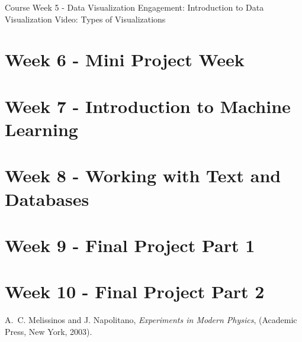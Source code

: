 \documentclass[letterpaper,12pt]{article}
\begin{document}
Course   Week 5 - Data Visualization   Engagement: Introduction to Data Visualization   Video: Types of Visualizations


\section{Week 6 - Mini Project Week
}

\section{Week 7 - Introduction to Machine Learning
}
\section{Week 8 - Working with Text and Databases
}


\section{Week 9 - Final Project Part 1
}

\section{Week 10 - Final Project Part 2
}

\begin{thebibliography}{99}

A.~C. Melissinos and J. Napolitano, \textit{Experiments in Modern Physics},
(Academic Press, New York, 2003).


\end{thebibliography}
\end{document}
